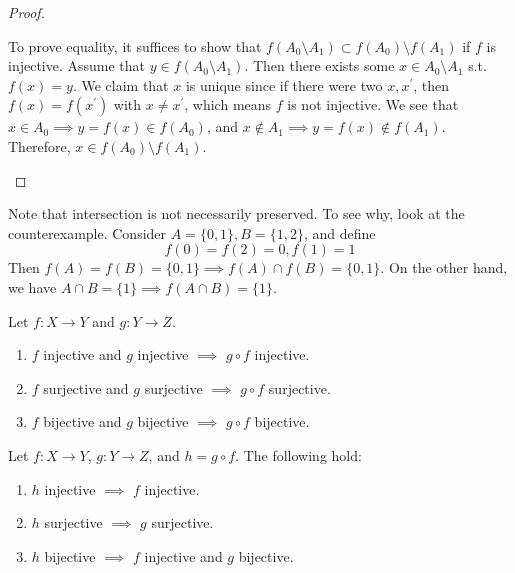 \documentclass{article}
\begin{document}
\begin{proof}
\begin{enumerate}
        To prove equality, it suffices to show that $f(A_0 \setminus A_1) \subset f(A_0) \setminus f(A_1)$ if $f$ is injective. Assume that $y \in f(A_0 \setminus A_1)$. Then there exists some $x \in A_0 \setminus A_1$ s.t. $f(x) = y$. We claim that $x$ is unique since if there were two $x, x^\prime$, then $f(x) = f(x^\prime)$ with $x \neq x^\prime$, which means $f$ is not injective. We see that $x \in A_0 \implies y = f(x) \in f(A_0)$, and $x \not\in A_1 \implies y = f(x) \not\in f(A_1)$. Therefore, $x \in f(A_0) \setminus f(A_1)$. 
      \end{enumerate}
    \end{proof} 

    \begin{example}
      Note that intersection is not necessarily preserved. To see why, look at the counterexample. Consider $A = \{0, 1\}, B = \{1, 2\}$, and define 
      \begin{equation}
        f(0) = f(2) = 0, f(1) = 1
      \end{equation} 
      Then $f(A) = f(B) = \{0, 1\} \implies f(A) \cap f(B) = \{0, 1\}$. On the other hand, we have $A \cap B = \{1\} \implies f(A \cap B) = \{1\}$. 
    \end{example}

    \begin{theorem}[Composition]
      Let $f: X \rightarrow Y$ and $g: Y \rightarrow Z$. 
      \begin{enumerate}
        \item $f$ injective and $g$ injective $\implies$ $g \circ f$ injective. 
        \item $f$ surjective and $g$ surjective $\implies$ $g \circ f$ surjective. 
        \item $f$ bijective and $g$ bijective $\implies$ $g \circ f$ bijective. 
      \end{enumerate}
    \end{theorem}

    \begin{theorem}
      Let $f: X \rightarrow Y$, $g: Y \rightarrow Z$, and $h = g \circ f$. The following hold: 
      \begin{enumerate}
        \item $h$ injective $\implies$ $f$ injective. 
        \item $h$ surjective $\implies$ $g$ surjective. 
        \item $h$ bijective $\implies$ $f$ injective and $g$ bijective. 
      \end{enumerate}
    \end{theorem} 
\end{document}
